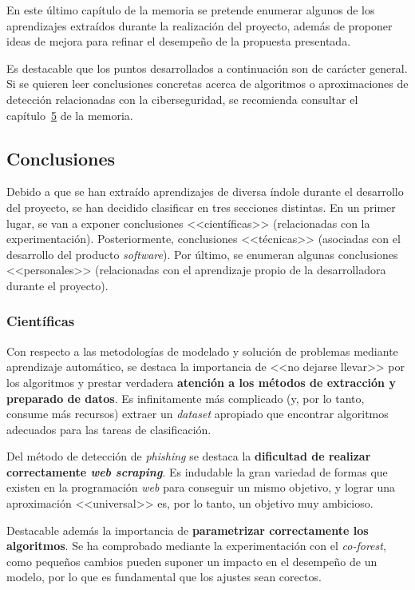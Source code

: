 
En este último capítulo de la memoria se pretende enumerar algunos de los aprendizajes extraídos durante la realización del proyecto, además de proponer ideas de mejora para refinar el desempeño de la propuesta presentada.

Es destacable que los puntos desarrollados a continuación son de carácter general. Si se quieren leer conclusiones concretas acerca de algoritmos o aproximaciones de detección relacionadas con la ciberseguridad, se recomienda consultar el capítulo~\hyperref[s:5]{5} de la memoria.

\subsection{Conclusiones}

Debido a que se han extraído aprendizajes de diversa índole durante el desarrollo del proyecto, se han decidido clasificar en tres secciones distintas. En un primer lugar, se van a exponer conclusiones <<científicas>> (relacionadas con la experimentación). Posteriormente, conclusiones <<técnicas>> (asociadas con el desarrollo del producto \textit{software}). Por último, se enumeran algunas conclusiones <<personales>> (relacionadas con el aprendizaje propio de la desarrolladora durante el proyecto).

\subsubsection{Científicas}

Con respecto a las metodologías de modelado y solución de problemas mediante aprendizaje automático, se destaca la importancia de <<no dejarse llevar>> por los algoritmos y prestar verdadera \textbf{atención a los métodos de extracción y preparado de datos}. Es infinitamente más complicado (y, por lo tanto, consume más recursos) extraer un \textit{dataset} apropiado que encontrar algoritmos adecuados para las tareas de clasificación.

Del método de detección de \textit{phishing} se destaca la \textbf{dificultad de realizar correctamente \textit{web scraping}}. Es indudable la gran variedad de formas que existen en la programación \textit{web} para conseguir un mismo objetivo, y lograr una aproximación <<universal>> es, por lo tanto, un objetivo muy ambicioso.

Destacable además la importancia de \textbf{parametrizar correctamente los algoritmos}. Se ha comprobado mediante la experimentación con el \textit{co-forest}, como pequeños cambios pueden suponer un impacto en el desempeño de un modelo, por lo que es fundamental que los ajustes sean corectos.

